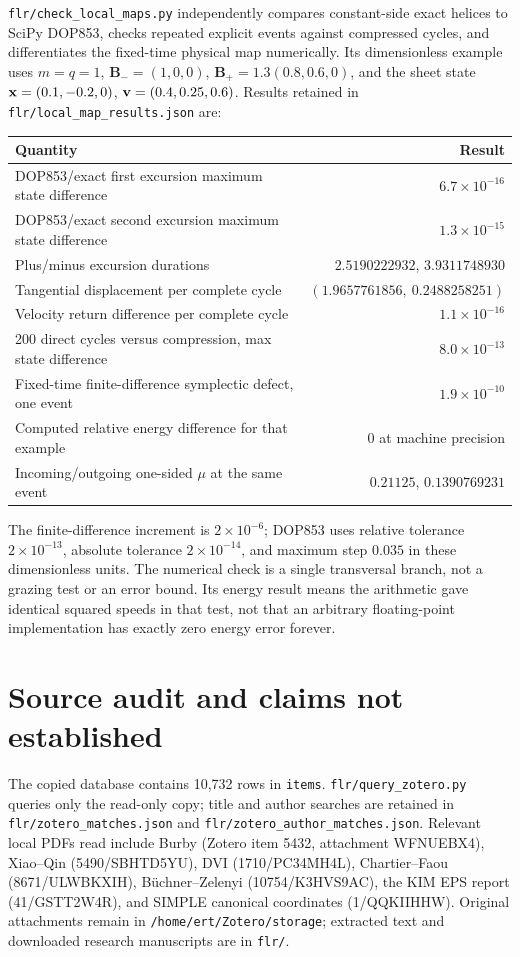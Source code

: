 \documentclass[10pt,a4paper]{article}
\newcommand{\B}{\mathbf B}\newcommand{\bunit}{\mathbf b}
\newcommand{\pathref}[1]{\texttt{\nolinkurl{#1}}}
\begin{document}
\pathref{flr/check_local_maps.py} independently compares constant-side exact helices to SciPy DOP853, checks repeated explicit events against compressed cycles, and differentiates the fixed-time physical map numerically. Its dimensionless example uses $m=q=1$, $\B_-=(1,0,0)$, $\B_+=1.3(0.8,0.6,0)$, and the sheet state $\mathbf x=(0.1,-0.2,0)$, $\mathbf v=(0.4,0.25,0.6)$. Results retained in \pathref{flr/local_map_results.json} are:
\begin{center}
\begin{tabular}{lr}
\toprule
Quantity & Result\\\midrule
DOP853/exact first excursion maximum state difference & $6.7\times10^{-16}$\\
DOP853/exact second excursion maximum state difference & $1.3\times10^{-15}$\\
Plus/minus excursion durations & $2.5190222932$, $3.9311748930$\\
Tangential displacement per complete cycle & $(1.9657761856,\ 0.2488258251)$\\
Velocity return difference per complete cycle & $1.1\times10^{-16}$\\
200 direct cycles versus compression, max state difference & $8.0\times10^{-13}$\\
Fixed-time finite-difference symplectic defect, one event & $1.9\times10^{-10}$\\
Computed relative energy difference for that example & $0$ at machine precision\\
Incoming/outgoing one-sided $\mu$ at the same event & $0.21125$, $0.1390769231$\\
\bottomrule
\end{tabular}
\end{center}
The finite-difference increment is $2\times10^{-6}$; DOP853 uses relative tolerance $2\times10^{-13}$, absolute tolerance $2\times10^{-14}$, and maximum step $0.035$ in these dimensionless units. The numerical check is a single transversal branch, not a grazing test or an error bound. Its energy result means the arithmetic gave identical squared speeds in that test, not that an arbitrary floating-point implementation has exactly zero energy error forever.

\section{Source audit and claims not established}
\label{app:sources}
The copied database contains 10,732 rows in \texttt{items}. \pathref{flr/query_zotero.py} queries only the read-only copy; title and author searches are retained in \pathref{flr/zotero_matches.json} and \pathref{flr/zotero_author_matches.json}. Relevant local PDFs read include Burby (Zotero item 5432, attachment WFNUEBX4), Xiao--Qin (5490/SBHTD5YU), DVI (1710/PC34MH4L), Chartier--Faou (8671/ULWBKXIH), B\"uchner--Zelenyi (10754/K3HVS9AC), the KIM EPS report (41/GSTT2W4R), and SIMPLE canonical coordinates (1/QQKIIHHW). Original attachments remain in \pathref{/home/ert/Zotero/storage}; extracted text and downloaded research manuscripts are in \pathref{flr/}.
\end{document}

